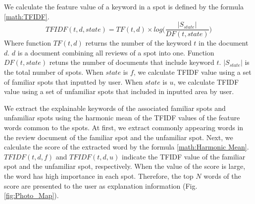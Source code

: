 \documentclass[journal]{IAENGtran}
\begin{document}
We calculate the feature value of a keyword in a spot is defined by the formula \ref{math:TFIDF}.
\begin{equation}
  TFIDF(t,d,state) = TF(t,d) \times log\Biggr(\frac{|S_{state}|}{DF(t,state)}\Biggr)
  \label{math:TFIDF}
\end{equation}
Where function $TF(t,d)$ returns the number of the keyword $t$ in the document $d$.
$d$ is a document combining all reviews of a spot into one.
Function $DF(t,state)$ retuns the number of documents that include keyword $t$.
$|S_{state}|$ is the total number of spots.
When $state$ is $f$, we calculate TFIDF value using a set of familiar spots that inputted by user.
When $state$ is $u$, we calculate TFIDF value using a set of unfamiliar spots that included in inputted area by user.

We extract the explainable keywords of the associated familiar spots and unfamiliar spots using the harmonic mean of the TFIDF values of the feature words common to the spots.
At first, we extract commonly appearing words in the review document of the familiar spot and the unfamiliar spot.
Next, we calculate the score of the extracted word by the formula \ref{math:Harmonic Mean}.
$TFIDF(t,d,f)$ and $TFIDF(t,d,u)$ indicate the TFIDF value of the familiar spot and the unfamiliar spot, respectively.
When the value of the score is large, the word has high importance in each spot.
Therefore, the top $N$ words of the score are presented to the user as explanation information (Fig. \ref{fig:Photo_Map}).
\end{document}
